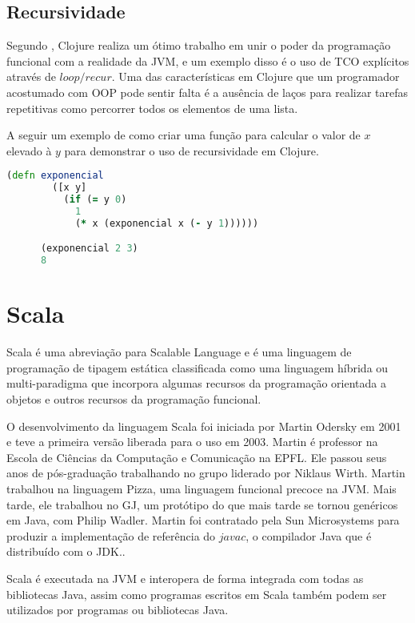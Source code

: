     \subsection{Recursividade}

    Segundo , Clojure realiza um ótimo trabalho em unir o poder da programação funcional com a realidade da \ac{JVM}, e um exemplo disso é o uso de \ac{TCO} explícitos através de $loop/recur$. Uma das características em Clojure que um programador acostumado com \ac{OOP} pode sentir falta é a ausência de laços para realizar tarefas repetitivas como percorrer todos os elementos de uma lista.

    A seguir um exemplo de como criar uma função para calcular o valor de $x$ elevado à $y$ para demonstrar o uso de recursividade em Clojure.

    \begin{lstlisting}[language=Clojure, mathescape=false]
      (defn exponencial
        ([x y]
          (if (= y 0)
            1
            (* x (exponencial x (- y 1))))))

      (exponencial 2 3)
      8
    \end{lstlisting}

  \section{Scala}

  Scala é uma abreviação para Scalable Language e é uma linguagem de programação de tipagem estática classificada como uma linguagem híbrida ou multi-paradigma que incorpora algumas recursos da programação orientada a objetos e outros recursos da programação funcional.

  O desenvolvimento da linguagem Scala foi iniciada por Martin Odersky em 2001 e teve a primeira versão liberada para o uso em 2003. Martin é professor na Escola de Ciências da Computação e Comunicação na \ac{EPFL}. Ele passou seus anos de pós-graduação trabalhando no grupo liderado por Niklaus Wirth. Martin trabalhou na linguagem Pizza, uma linguagem funcional precoce na JVM. Mais tarde, ele trabalhou no GJ, um protótipo do que mais tarde se tornou genéricos em Java, com Philip Wadler. Martin foi contratado pela Sun Microsystems para produzir a implementação de referência do $javac$, o compilador Java que é distribuído com o \ac{JDK}.\cite{sevenLangs}.

  Scala é executada na \ac{JVM} e interopera de forma integrada com todas as bibliotecas Java, assim como programas escritos em Scala também podem ser utilizados por programas ou bibliotecas Java.

